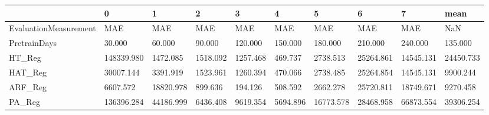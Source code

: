 \begin{tabular}{llllllllll}
\toprule
{} &          0 &         1 &        2 &        3 &        4 &         5 &         6 &         7 &      mean \\
\midrule
EvaluationMeasurement &        MAE &       MAE &      MAE &      MAE &      MAE &       MAE &       MAE &       MAE &       NaN \\
PretrainDays          &     30.000 &    60.000 &   90.000 &  120.000 &  150.000 &   180.000 &   210.000 &   240.000 &   135.000 \\
HT\_Reg                & 148339.980 &  1472.085 & 1518.092 & 1257.468 &  469.737 &  2738.513 & 25264.861 & 14545.131 & 24450.733 \\
HAT\_Reg               &  30007.144 &  3391.919 & 1523.961 & 1260.394 &  470.066 &  2738.485 & 25264.854 & 14545.131 &  9900.244 \\
ARF\_Reg               &   6607.572 & 18820.978 &  899.636 &  194.126 &  508.592 &  2662.278 & 25720.811 & 18749.671 &  9270.458 \\
PA\_Reg                & 136396.284 & 44186.999 & 6436.408 & 9619.354 & 5694.896 & 16773.578 & 28468.958 & 66873.554 & 39306.254 \\
\bottomrule
\end{tabular}
